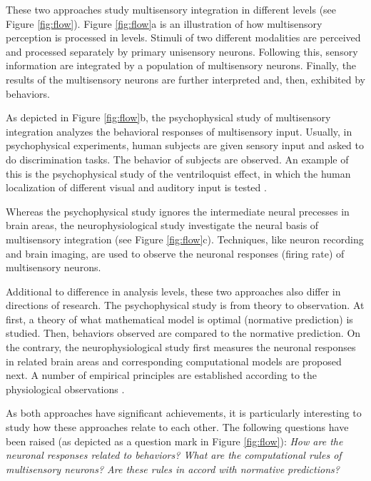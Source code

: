 \documentclass{article}[11pt]
\begin{document}
These two approaches study multisensory integration in different levels (see Figure \ref{fig:flow}).
Figure \ref{fig:flow}a is an illustration of how multisensory perception is processed in levels. Stimuli of two different modalities are perceived and processed separately by primary unisensory neurons. Following this, sensory information are integrated by a population of multisensory neurons. Finally, the results of the multisensory neurons are further interpreted and, then, exhibited by behaviors.

As depicted in Figure \ref{fig:flow}b, the psychophysical study of multisensory integration analyzes the behavioral responses of multisensory input. Usually, in psychophysical experiments, human subjects are given sensory input and asked to do discrimination tasks. The behavior of subjects are observed. An example of this is the psychophysical study of the ventriloquist effect, in which the human localization of different visual and auditory input is tested \cite{alais_ventriloquist_2004}.

Whereas the psychophysical study ignores the intermediate neural precesses in brain areas, the neurophysiological study investigate the neural basis of multisensory integration (see Figure \ref{fig:flow}c). Techniques, like neuron recording and brain imaging, are used to observe the neuronal responses (firing rate) of multisensory neurons.

Additional to difference in analysis levels, these two approaches also differ in directions of research. The psychophysical study is from theory to observation. At first, a theory of what mathematical model is optimal (normative prediction) is studied. Then, behaviors observed are compared to the normative prediction. On the contrary, the neurophysiological study first measures the neuronal responses in related brain areas and corresponding computational models are proposed next. A number of empirical principles are established according to the physiological observations \cite{stein_merging_1993, stanford_evaluating_2005}.

As both approaches have significant achievements, it is particularly interesting to study how these approaches relate to each other. The following questions have been raised (as depicted as a question mark in Figure \ref{fig:flow}): \emph{How are the neuronal responses related to behaviors? What are the computational rules of multisensory neurons? Are these rules in accord with normative predictions?} 

\end{document}
